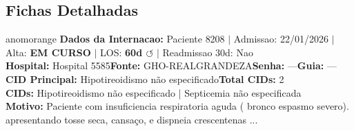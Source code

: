 \documentclass[a4paper,10pt]{article}
\begin{document}
\subsection{Fichas Detalhadas}
\begin{anomalycard}[Internacao 11421 | GHO-REALGRANDEZA | ALTO (z=4.05)]{anomorange}
\textbf{Dados da Internacao:} Paciente 8208 $\mid$ Admissao: 22/01/2026 $\mid$ Alta: \textcolor{anomorange}{\textbf{EM CURSO}} $\mid$ LOS: \textbf{60d \textcolor{anomorange}{$\circlearrowleft$}} $\mid$ Readmissao 30d: Nao\\
\textbf{Hospital:} Hospital 5585\quad\textbf{Fonte:} GHO-REALGRANDEZA\quad\textbf{Senha:} ---\quad\textbf{Guia:} ---\\
\textbf{CID Principal:} {\small Hipotireoidismo não especificado}\quad\textbf{Total CIDs:} 2\\

\textbf{CIDs:} {\scriptsize Hipotireoidismo não especificado | Septicemia não especificada}\\

\textbf{Motivo:} {\scriptsize Paciente com insuficiencia respiratoria aguda ( bronco espasmo severo). apresentando tosse seca, cansaço, e dispneia crescentenas ...}\\


\end{anomalycard}
\end{document}
